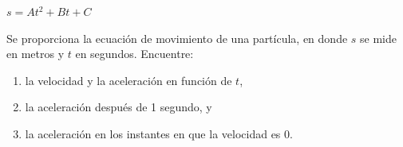 \item $s = At^2 + Bt + C$
\par
Se proporciona la ecuación de movimiento de una partícula, en donde $s$ se mide en metros y $t$ en segundos. Encuentre:
\begin{enumerate}
    \item[(a)] la velocidad y la aceleración en función de $t$,
    \item[(b)] la aceleración después de 1 segundo, y
    \item[(c)] la aceleración en los instantes en que la velocidad es 0.
\end{enumerate}
